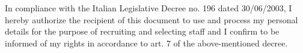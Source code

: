\begin{cventries}
  \cventry
    {}
    {}
    {}
    {}
    {
      In compliance with the Italian Legislative Decree no. 196 dated 30/06/2003, I hereby authorize the recipient of this document to use and process
my personal details for the purpose of recruiting and selecting staff and I confirm to be informed of my rights in accordance to art. 7 of the above-mentioned decree.
    }
 
\end{cventries}
